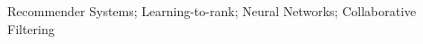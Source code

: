 \documentclass[10pt,journal,compsoc]{IEEEtran}
\begin{document}
\begin{sloppypar}
{%
\begin{IEEEkeywords}
Recommender Systems; Learning-to-rank; Neural Networks; Collaborative Filtering
\end{IEEEkeywords}}


\maketitle


\IEEEdisplaynontitleabstractindextext



%
\IEEEpeerreviewmaketitle








\end{sloppypar}
\end{document}
